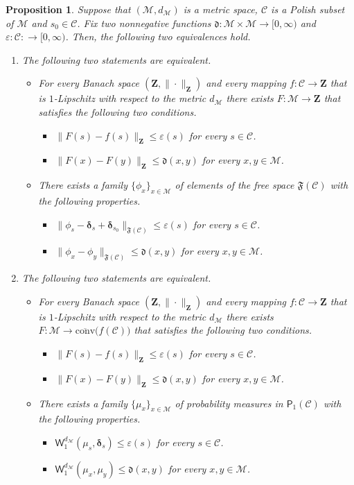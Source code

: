 \documentclass[11pt,reqno]{amsart}
\renewcommand{\le}{\leqslant}
\newcommand{\bd}{\boldsymbol{\delta}}
\renewcommand{\bd}{\boldsymbol{\delta}}
\newcommand{\e}{\varepsilon}
\newtheorem{proposition}[theorem]{Proposition}
\theoremstyle{remark}
\newcommand{\MM}{\mathcal{M}}
\newcommand{\W}{\mathsf{W}}
\newcommand{\bfZ}{\mathbf{Z}}
\newcommand{\sub}{\mathscr{C}}
\renewcommand{\1}{\mathbf 1}
\newcommand{\conv}{\mathrm{conv}}
\begin{document}
\begin{proposition}\label{lem:measure formulation} Suppose that $(\MM,d_\MM)$ is a metric space, $\sub$ is a Polish subset of $\MM$ and $s_0\in \sub$. Fix two nonnegative functions  $\mathfrak{d}:\MM\times \MM\to [0,\infty)$ and $\e:\sub:\to [0,\infty)$. Then, the following two equivalences hold.
\begin{enumerate}
\item The following two statements are equivalent.
\begin{itemize}
\item For every Banach space $(\bfZ,\|\cdot\|_{\bfZ})$ and every mapping $f:\sub\to \bfZ$ that is $1$-Lipschitz with respect to the metric $d_\MM$ there exists $F:\MM\to \bfZ$ that satisfies the following two conditions.
    \begin{itemize}
    \item $\|F(s)-f(s)\|_\bfZ\le \e(s)$ for every $s\in \sub$.
    \item $\|F(x)-F(y)\|_\bfZ\le \mathfrak{d}(x,y)$ for every $x,y\in \MM$.
    \end{itemize}
    \item There exists a family $\{\phi_x\}_{x\in \MM}$ of elements of the free space $\mathfrak{F}(\sub)$ with the following properties.
    \begin{itemize}
     \item $\|\phi_s-\bd_s+\bd_{s_0}\|_{\mathfrak{F}(\sub)}\le \e(s)$ for every $s\in \sub$.
      \item $\|\phi_x-\phi_y\|_{\mathfrak{F}(\sub)}\le\mathfrak{d}(x,y)$ for every $x,y\in \MM$.
\end{itemize}
\end{itemize}

\item The following two statements are equivalent.
\begin{itemize}
\item For every Banach space $(\bfZ,\|\cdot\|_{\bfZ})$ and every mapping $f:\sub\to \bfZ$ that is $1$-Lipschitz with respect to the metric $d_\MM$ there exists $F:\MM\to \overline{\conv}\big(f(\sub)\big)$ that satisfies the following two conditions.
    \begin{itemize}
    \item $\|F(s)-f(s)\|_\bfZ\le \e(s)$ for every $s\in \sub$.
    \item $\|F(x)-F(y)\|_\bfZ\le \mathfrak{d}(x,y)$ for every $x,y\in \MM$.
    \end{itemize}
    \item  There exists a family $\{\mu_x\}_{x\in \MM}$ of probability measures in  $\mathsf{P}_1(\sub)$ with the following properties.
  \begin{itemize}
  \item $\W_1^{d_\MM}(\mu_s,\bd_s)\le \e(s)$ for every $s\in \sub$.
  \item $\W_1^{d_\MM}(\mu_x,\mu_y)\le \mathfrak{d}(x,y)$ for every $x,y\in \MM$.
  \end{itemize}
\end{itemize}
\end{enumerate}
\end{proposition}
\end{document}
